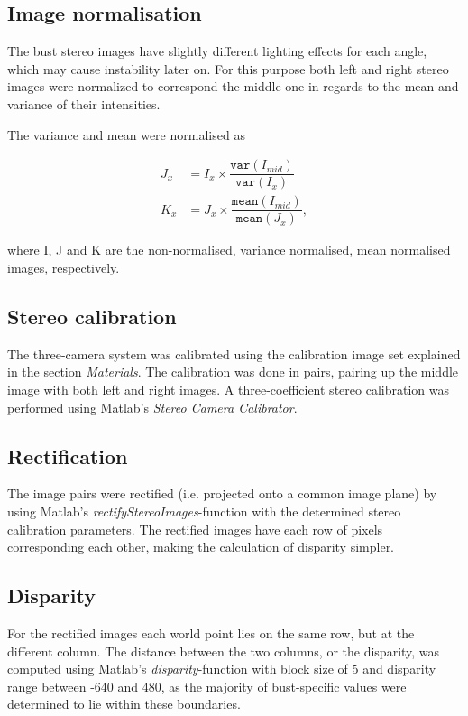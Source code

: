 \documentclass[journal]{IEEEtran}
\begin{document}
\subsection{Image normalisation}

The bust stereo images have slightly different lighting effects for each angle, which may cause instability later on.
For this purpose both left and right stereo images were normalized to correspond the middle one in regards to the mean and variance of their intensities.

The variance and mean were normalised as 

\begin{align}
J_{x} &= I_{x} \times \dfrac{\texttt{var}(I_{mid})}{\texttt{var}(I_x)}\\
K_{x} &= J_{x} \times \dfrac{\texttt{mean}(I_{mid})}{\texttt{mean}(J_x)},
\end{align}

\noindent where I, J and K are the non-normalised, variance normalised, mean normalised images, respectively.


\subsection{Stereo calibration}

The three-camera system was calibrated using the calibration image set explained in the section \textit{Materials}. 
The calibration was done in pairs, pairing up the middle image with both left and right images.
A three-coefficient stereo calibration was performed using Matlab's \textit{Stereo Camera Calibrator}.


\subsection{Rectification}

The image pairs were rectified (i.e. projected onto a common image plane) by using Matlab's \textit{rectifyStereoImages}-function with the determined stereo calibration parameters.
The rectified images have each row of pixels corresponding each other, making the calculation of disparity simpler.


\subsection{Disparity}

For the rectified images each world point lies on the same row, but at the different column. 
The distance between the two columns, or the disparity, was computed using Matlab's \textit{disparity}-function with block size of 5 and disparity range between -640 and 480, as the majority of bust-specific values were determined to lie within these boundaries.  %
\end{document}
